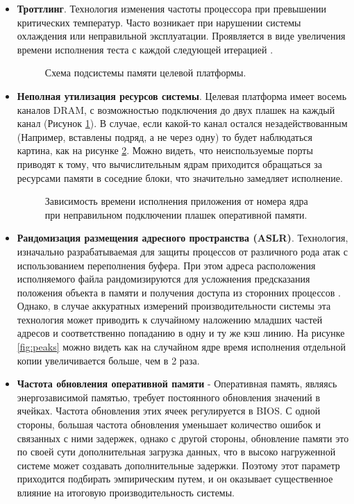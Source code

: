 \begin{itemize}
	\item  \textbf{Троттлинг}. Технология изменения частоты процессора при превышении критических температур. Часто возникает при нарушении системы охлаждения или неправильной эксплуатации. Проявляется в виде увеличения времени исполнения теста с каждой следующей итерацией \cite{zhang2009hardware}.
		\begin{figure}[ht]
		\caption{Схема подсистемы памяти целевой платформы.}\label{fig:ddrsvg1}
	\end{figure}
	\item  \textbf{Неполная утилизация ресурсов системы}. Целевая платформа имеет восемь каналов DRAM, с возможностью подключения до двух плашек на каждый канал (Рисунок \ref{fig:ddrsvg1}). В случае, если какой-то канал остался незадействованным (Например, вставлены подряд, а не через одну) то будет наблюдаться картина, как на рисунке \ref{fig:lack_of_memmory}. Можно видеть, что неиспользуемые порты приводят к тому, что вычислительным ядрам приходится обращаться за ресурсами памяти в соседние блоки, что значительно замедляет исполнение.

	
	\begin{figure}[ht]
		\caption{Зависимость времени исполнения приложения от номера ядра при неправильном подключении плашек оперативной памяти.}\label{fig:lack_of_memmory}
	\end{figure}
	\item \textbf{Рандомизация размещения адресного пространства (ASLR)}. Технология, изначально разрабатываемая для защиты процессов от различного рода атак с использованием  переполнения буфера. При этом  адреса расположения исполняемого файла рандомизируются для усложнения предсказания положения объекта в памяти и получения доступа из сторонних процессов \cite{gras2017aslr}. Однако, в случае аккуратных измерений производительности системы эта технология может приводить к случайному наложению младших частей адресов и соответственно попаданию в одну и ту же кэш линию. На рисунке \ref{fig:peaks}  можно видеть как на случайном ядре время исполнения отдельной копии увеличивается больше, чем в 2 раза.
	\item \textbf{Частота обновления оперативной памяти} - Оперативная память, являясь энергозависимой памятью, требует постоянного обновления значений в ячейках. Частота обновления этих ячеек регулируется в BIOS. С одной стороны, большая частота обновления уменьшает количество ошибок и связанных с ними задержек, однако с другой стороны, обновление памяти это по своей сути дополнительная загрузка данных, что в высоко нагруженной системе может создавать дополнительные задержки. Поэтому этот параметр приходится подбирать эмпирическим путем, и он оказывает существенное влияние на итоговую производительность системы.
	

\end{itemize}
